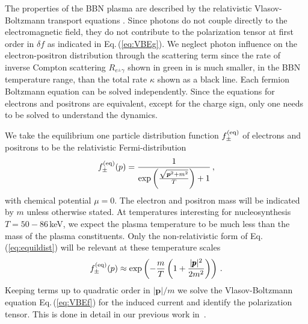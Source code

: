 \label{sec:kinetic_theory}
The properties of the BBN plasma are described by the relativistic Vlasov-Boltzmann transport equations . Since photons do not couple directly to the electromagnetic field, they do not contribute to the polarization tensor at first order in $\delta f$ as indicated in Eq.\,(\ref{eq:VBEg}). We neglect photon influence on the electron-positron distribution through the scattering term since the rate of inverse Compton scattering $R_{e^{\pm}\gamma }$ shown in green in  is much smaller, in the BBN temperature range, than the total rate $\kappa$ shown as a black line. Each fermion Boltzmann equation  can be solved independently. Since the equations for electrons and positrons are equivalent, except for the charge sign, only one needs to be solved to understand the dynamics.


We take the equilibrium one particle distribution function $f_\pm^{(\mathrm{eq})}$ of electrons and positrons to be the relativistic Fermi-distribution
\begin{equation}\label{eq:equildist}
f^{(\mathrm{eq})}_\pm(p) = \frac{1}{\exp{\left(\frac{\sqrt{\boldsymbol{p}^2 + m^2}}{T}\right)}
+1}\,,
\end{equation}
with chemical potential $\mu = 0 $. The electron and positron mass will be indicated by $m$ unless otherwise stated. At temperatures interesting for nucleosynthesis $T = 50-86$\,keV, we expect the plasma temperature to be much less than the mass of the plasma constituents. Only the non-relativistic form of Eq.\,(\ref{eq:equildist}) will be relevant at these temperature scales
\begin{equation}
f^{(\mathrm{eq})}_\pm(p) \approx \exp\left(- \frac{m}{T}\left(1+\frac{|\pmb{p}|^2}{2m^2}\right)\right)\,.
\end{equation}
Keeping terms up to quadratic order in $|\boldsymbol{p}|/m$ we solve the Vlasov-Boltzmann equation Eq.\,(\ref{eq:VBEf}) for the induced current and identify the polarization tensor. This is done in detail in our previous work in~\cite{Formanek:2021blc}.

